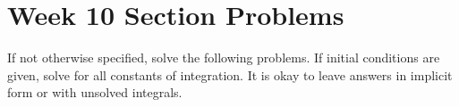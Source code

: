 \documentclass[letterpaper, fontsize=11pt]{scrartcl} %
\numberwithin{equation}{section} %
\numberwithin{figure}{section} %
\numberwithin{table}{section} %
\begin{document}

\newcommand{\horrule}[1]{\rule{\linewidth}{#1}} %


\section*{Week 10 Section Problems}
\par If not otherwise specified, solve the following problems. If initial conditions are given, solve for all constants of integration. It is okay to leave answers in implicit form or with unsolved integrals. 
\end{document}
